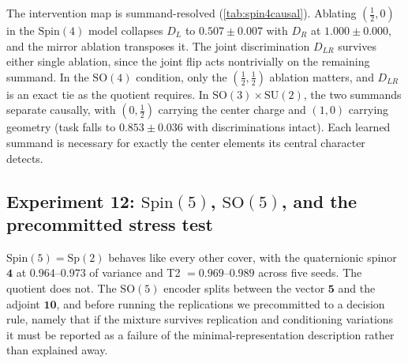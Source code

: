 \documentclass{article}
\newcommand{\SU}{\mathrm{SU}}
\newcommand{\SO}{\mathrm{SO}}
\newcommand{\Spin}{\mathrm{Spin}}
\newcommand{\Sp}{\mathrm{Sp}}
\begin{document}
The intervention map is summand-resolved
(\cref{tab:spin4causal}). Ablating $(\tfrac12, 0)$ in the $\Spin(4)$
model collapses $D_L$ to $0.507 \pm 0.007$ with $D_R$ at
$1.000 \pm 0.000$, and the mirror ablation transposes it. The joint discrimination $D_{LR}$ survives either single ablation, since
the joint flip acts nontrivially on the remaining summand. In the $\SO(4)$
condition, only the $(\tfrac12,\tfrac12)$ ablation matters, and
$D_{LR}$ is an exact tie as the quotient requires. In
$\SO(3){\times}\SU(2)$, the two summands separate causally, with
$(0,\tfrac12)$ carrying the center charge and $(1,0)$ carrying
geometry (task falls to $0.853 \pm 0.036$ with discriminations
intact). Each learned summand is necessary for exactly the center
elements its central character detects.

\subsection{Experiment 12: \texorpdfstring{$\Spin(5)$, $\SO(5)$}{Spin(5), SO(5)},
and the precommitted stress test}

$\Spin(5) = \Sp(2)$ behaves like every other cover, with the
quaternionic spinor $\mathbf{4}$ at $0.964$--$0.973$ of variance and
T2 $= 0.969$--$0.989$ across five seeds. The quotient does not. The
$\SO(5)$ encoder splits between the vector $\mathbf{5}$ and the
adjoint $\mathbf{10}$, and before running the replications we
precommitted to a decision rule, namely that if the mixture survives
replication and conditioning variations it must be reported as a
failure of the minimal-representation description rather than
explained away.
\end{document}
